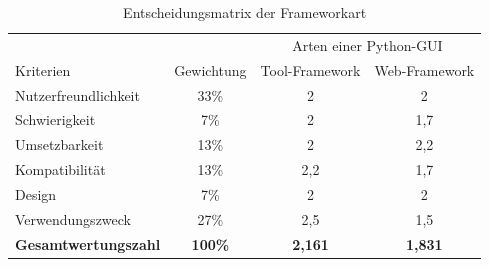 \documentclass[a4paper,titlepage,halfparskip,12pt]{scrreprt}
\begin{document}
\begin{onehalfspacing}
\begin{table}[h]
\centering
	\begin{tabular}{l|c|c|c}
		& & \multicolumn{2}{c}{Arten einer Python-GUI} \\
		Kriterien & Gewichtung & Tool-Framework & Web-Framework \\
		\hline
		Nutzerfreundlichkeit & 33\% & 2 & 2 \\
		\hline
		Schwierigkeit & 7\% & 2 & 1,7  \\
		\hline
		Umsetzbarkeit & 13\% & 2 & 2,2\\
		\hline
		Kompatibilität & 13\% & 2,2 & 1,7 \\
		\hline
		Design & 7\% & 2 &  2\\
		\hline 
		Verwendungszweck & 27\% & 2,5 & 1,5 \\
		\hline
		\textbf{Gesamtwertungszahl} & \textbf{100\%} & \textbf{2,161} & \textbf{1,831} \\
	\end{tabular}
\caption{Entscheidungsmatrix der Frameworkart} %
\label{tab:EntscheidungsmatrixFrameworkart}
\end{table} \\

\end{onehalfspacing}
\end{document}
